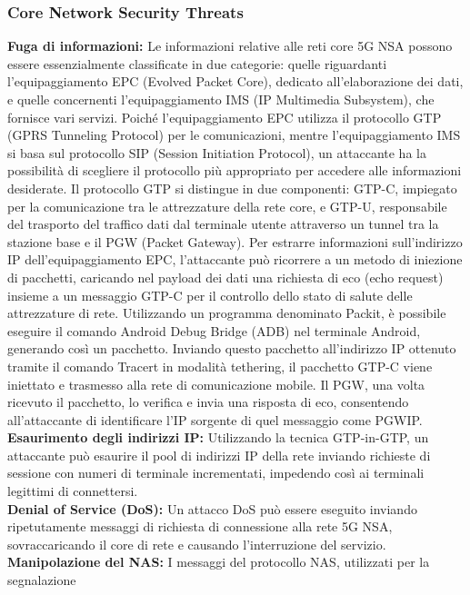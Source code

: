 \documentclass[english]{article}
\begin{document}
\subsubsection{Core Network Security Threats}
\textbf{Fuga di informazioni:}
Le informazioni relative alle reti core 5G NSA possono essere essenzialmente
classificate in due categorie: quelle riguardanti l'equipaggiamento EPC (Evolved Packet Core),
dedicato all'elaborazione dei dati, e quelle concernenti l'equipaggiamento IMS (IP Multimedia Subsystem),
che fornisce vari servizi. Poiché l'equipaggiamento EPC utilizza il protocollo
GTP (GPRS Tunneling Protocol) per le comunicazioni,
mentre l'equipaggiamento IMS si basa sul protocollo SIP (Session Initiation Protocol),
un attaccante ha la possibilità di scegliere il protocollo più appropriato per accedere
alle informazioni desiderate.
Il protocollo GTP si distingue in due componenti: GTP-C,
impiegato per la comunicazione tra le attrezzature della rete core, e GTP-U,
responsabile del trasporto del traffico dati dal terminale utente attraverso
un tunnel tra la stazione base e il PGW (Packet Gateway). Per estrarre informazioni
sull'indirizzo IP dell'equipaggiamento EPC, l'attaccante può ricorrere a un metodo di
iniezione di pacchetti, caricando nel payload dei dati una richiesta di eco (echo request)
insieme a un messaggio GTP-C per il controllo dello stato di salute delle attrezzature di rete.
Utilizzando un programma denominato Packit, è possibile eseguire il comando
Android Debug Bridge (ADB) nel terminale Android, generando così un pacchetto.
Inviando questo pacchetto all'indirizzo IP ottenuto tramite il comando Tracert in modalità tethering,
il pacchetto GTP-C viene iniettato e trasmesso alla rete di comunicazione mobile.
Il PGW, una volta ricevuto il pacchetto, lo verifica e invia una risposta di eco,
consentendo all'attaccante di identificare l'IP sorgente di quel messaggio come PGWIP.
\\[0.2cm]
\textbf{Esaurimento degli indirizzi IP:} Utilizzando la tecnica GTP-in-GTP, un attaccante
può esaurire il pool di indirizzi IP della rete inviando richieste di sessione con numeri
di terminale incrementati, impedendo così ai terminali legittimi di connettersi.
\\[0.2cm]
\textbf{Denial of Service (DoS):} Un attacco DoS può essere eseguito inviando ripetutamente
messaggi di richiesta di connessione alla rete 5G NSA, sovraccaricando il core di rete e
causando l'interruzione del servizio.
\\[0.2cm]
\textbf{Manipolazione del NAS:} I messaggi del protocollo NAS, utilizzati per la segnalazione
\end{document}
